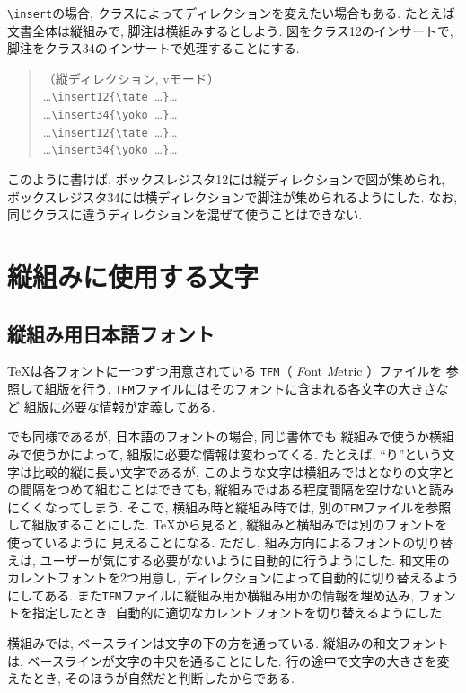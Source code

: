 \verb|\insert|の場合, クラスによってディレクションを変えたい場合もある.
たとえば文書全体は縦組みで, 脚注は横組みするとしよう.
図をクラス12のインサートで, 脚注をクラス34のインサートで処理することにする.
\begin{quote}
	（縦ディレクション, vモード）\\
	\ldots\verb|\insert12{\tate |\ldots\verb|}|\ldots\\
	\ldots\verb|\insert34{\yoko |\ldots\verb|}|\ldots\\
	\ldots\verb|\insert12{\tate |\ldots\verb|}|\ldots\\
	\ldots\verb|\insert34{\yoko |\ldots\verb|}|\ldots
\end{quote}
このように書けば,
ボックスレジスタ12には縦ディレクションで図が集められ,
ボックスレジスタ34には横ディレクションで脚注が集められるようにした.
なお, 同じクラスに違うディレクションを混ぜて使うことはできない.


\section{縦組みに使用する文字} \label{font}

\subsection{縦組み用日本語フォント}

\TeX は各フォントに一つずつ用意されている
{\tt TFM}（\kern0pt{\it\TeX\/} {\it F\/}ont {\it M\/}etric\kern0pt ）ファイルを
参照して組版を行う.
{\tt TFM}ファイルにはそのフォントに含まれる各文字の大きさなど
組版に必要な情報が定義してある.

\pTeX でも同様であるが, 日本語のフォントの場合, 同じ書体でも
縦組みで使うか横組みで使うかによって, 組版に必要な情報は変わってくる.
たとえば, ``り''という文字は比較的縦に長い文字であるが,
このような文字は横組みではとなりの文字との間隔をつめて組むことはできても,
縦組みではある程度間隔を空けないと読みにくくなってしまう.
そこで, 横組み時と縦組み時では,
別の\verb|TFM|ファイルを参照して組版することにした.
\TeX から見ると, 縦組みと横組みでは別のフォントを使っているように
見えることになる.
ただし, 組み方向によるフォントの切り替えは,
ユーザーが気にする必要がないように自動的に行うようにした.
和文用のカレントフォントを2つ用意し,
ディレクションによって自動的に切り替えるようにしてある.
また{\tt TFM}ファイルに縦組み用か横組み用かの情報を埋め込み,
フォントを指定したとき, 自動的に適切なカレントフォントを切り替えるようにした.

\label{jfont}
横組みでは, ベースラインは文字の下の方を通っている.
縦組みの和文フォントは, ベースラインが文字の中央を通ることにした.
行の途中で文字の大きさを変えたとき, そのほうが自然だと判断したからである.

